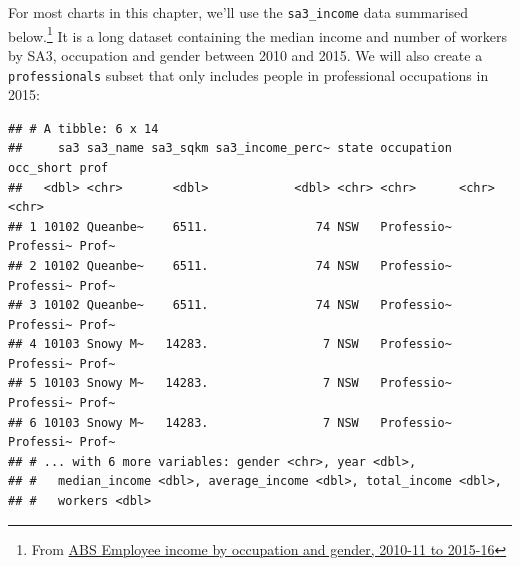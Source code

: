 \documentclass[]{book}
\newenvironment{Shaded}{\begin{snugshade}}{\end{snugshade}}
\newcommand{\CommentTok}[1]{\textcolor[rgb]{0.56,0.35,0.01}{\textit{#1}}}
\newcommand{\DecValTok}[1]{\textcolor[rgb]{0.00,0.00,0.81}{#1}}
\newcommand{\KeywordTok}[1]{\textcolor[rgb]{0.13,0.29,0.53}{\textbf{#1}}}
\newcommand{\NormalTok}[1]{#1}
\newcommand{\OperatorTok}[1]{\textcolor[rgb]{0.81,0.36,0.00}{\textbf{#1}}}
\newcommand{\StringTok}[1]{\textcolor[rgb]{0.31,0.60,0.02}{#1}}
\let\rmarkdownfootnote\footnote%
\def\footnote{\protect\rmarkdownfootnote}
\begin{document}
For most charts in this chapter, we'll use the \texttt{sa3\_income} data summarised below.\footnote{From \href{https://www.abs.gov.au/AUSSTATS/abs@.nsf/DetailsPage/6524.0.55.0022011-2016?OpenDocument}{ABS Employee income by occupation and gender, 2010-11 to 2015-16}} It is a long dataset containing the median income and number of workers by SA3, occupation and gender between 2010 and 2015. We will also create a \texttt{professionals} subset that only includes people in professional occupations in 2015:

\begin{Shaded}
\end{Shaded}

\begin{verbatim}
## # A tibble: 6 x 14
##     sa3 sa3_name sa3_sqkm sa3_income_perc~ state occupation occ_short prof 
##   <dbl> <chr>       <dbl>            <dbl> <chr> <chr>      <chr>     <chr>
## 1 10102 Queanbe~    6511.               74 NSW   Professio~ Professi~ Prof~
## 2 10102 Queanbe~    6511.               74 NSW   Professio~ Professi~ Prof~
## 3 10102 Queanbe~    6511.               74 NSW   Professio~ Professi~ Prof~
## 4 10103 Snowy M~   14283.                7 NSW   Professio~ Professi~ Prof~
## 5 10103 Snowy M~   14283.                7 NSW   Professio~ Professi~ Prof~
## 6 10103 Snowy M~   14283.                7 NSW   Professio~ Professi~ Prof~
## # ... with 6 more variables: gender <chr>, year <dbl>,
## #   median_income <dbl>, average_income <dbl>, total_income <dbl>,
## #   workers <dbl>
\end{verbatim}
\end{document}
